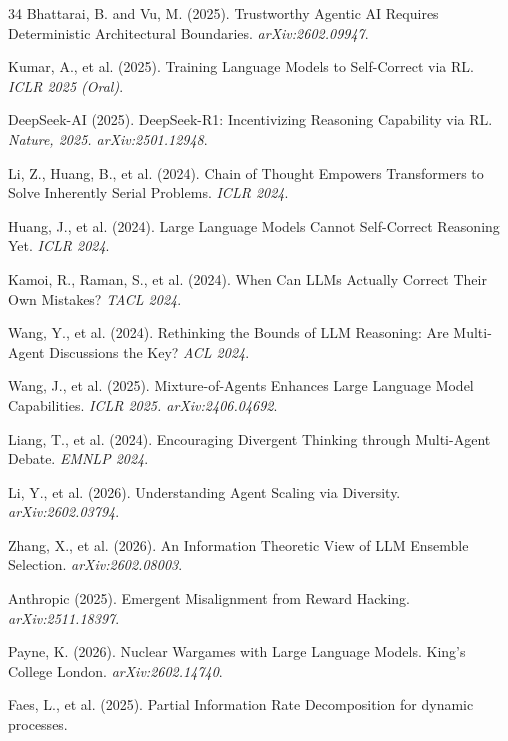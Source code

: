 \documentclass[11pt,a4paper]{article}
\theoremstyle{definition}
\begin{document}
\begin{thebibliography}{34}
Bhattarai, B. and Vu, M. (2025).
\newblock Trustworthy Agentic AI Requires Deterministic Architectural Boundaries.
\newblock \emph{arXiv:2602.09947}.

Kumar, A., et al. (2025).
\newblock Training Language Models to Self-Correct via RL.
\newblock \emph{ICLR 2025 (Oral)}.

DeepSeek-AI (2025).
\newblock DeepSeek-R1: Incentivizing Reasoning Capability via RL.
\newblock \emph{Nature, 2025. arXiv:2501.12948}.

Li, Z., Huang, B., et al. (2024).
\newblock Chain of Thought Empowers Transformers to Solve Inherently Serial Problems.
\newblock \emph{ICLR 2024}.

Huang, J., et al. (2024).
\newblock Large Language Models Cannot Self-Correct Reasoning Yet.
\newblock \emph{ICLR 2024}.

Kamoi, R., Raman, S., et al. (2024).
\newblock When Can LLMs Actually Correct Their Own Mistakes?
\newblock \emph{TACL 2024}.

Wang, Y., et al. (2024).
\newblock Rethinking the Bounds of LLM Reasoning: Are Multi-Agent Discussions the Key?
\newblock \emph{ACL 2024}.

Wang, J., et al. (2025).
\newblock Mixture-of-Agents Enhances Large Language Model Capabilities.
\newblock \emph{ICLR 2025. arXiv:2406.04692}.

Liang, T., et al. (2024).
\newblock Encouraging Divergent Thinking through Multi-Agent Debate.
\newblock \emph{EMNLP 2024}.

Li, Y., et al. (2026).
\newblock Understanding Agent Scaling via Diversity.
\newblock \emph{arXiv:2602.03794}.

Zhang, X., et al. (2026).
\newblock An Information Theoretic View of LLM Ensemble Selection.
\newblock \emph{arXiv:2602.08003}.

Anthropic (2025).
\newblock Emergent Misalignment from Reward Hacking.
\newblock \emph{arXiv:2511.18397}.

Payne, K. (2026).
\newblock Nuclear Wargames with Large Language Models.
\newblock King's College London. \emph{arXiv:2602.14740}.

Faes, L., et al. (2025).
\newblock Partial Information Rate Decomposition for dynamic processes.

\end{thebibliography}
\end{document}
